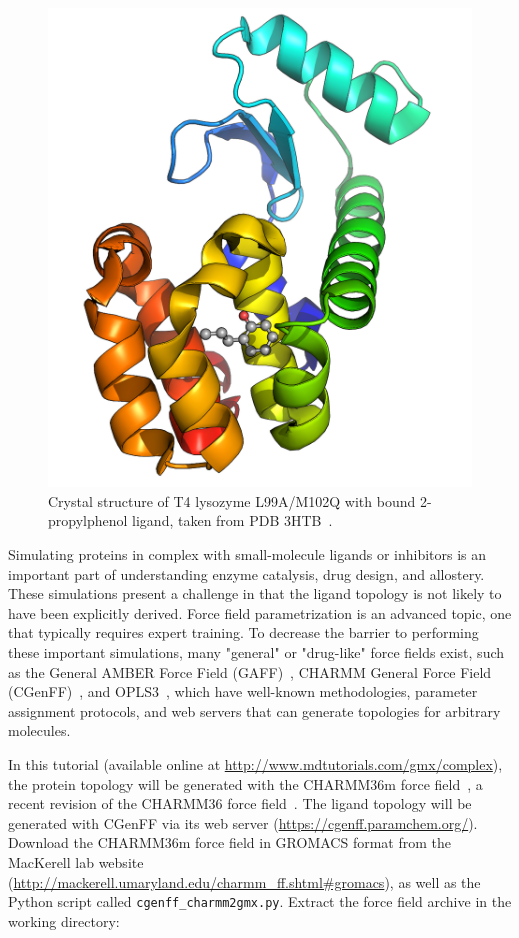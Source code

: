 \documentclass[9pt,tutorial]{livecoms}
\newcommand{\urlstring}{http://www.mdtutorials.com/gmx}
\newcommand{\tutorialcomplex}{\url{\urlstring/complex}}
\begin{document}
\begin{figure}[H]
\centering
\includegraphics{lysozyme_complex_3htb}
\caption{Crystal structure of T4 lysozyme L99A/M102Q with bound 2-propylphenol ligand, taken from PDB 3HTB~\cite{Boyce2009}.}
\label{lyso_complex_3htb_fig}
\end{figure}

Simulating proteins in complex with small-molecule ligands or inhibitors is an important part of understanding enzyme catalysis, drug design, and allostery. These simulations present a challenge in that the ligand topology is not likely to have been explicitly derived. Force field parametrization is an advanced topic, one that typically requires expert training. To decrease the barrier to performing these important simulations, many "general" or "drug-like" force fields exist, such as the General AMBER Force Field (GAFF)~\cite{Wang2004}, CHARMM General Force Field (CGenFF)~\cite{Vanommeslaeghe2010}, and OPLS3~\cite{Harder2016}, which have well-known methodologies, parameter assignment protocols, and web servers that can generate topologies for arbitrary molecules.

In this tutorial (available online at \tutorialcomplex), the protein topology will be generated with the CHARMM36m force field~\cite{Huang2016}, a recent revision of the CHARMM36 force field~\cite{Best2012}. The ligand topology will be generated with CGenFF via its web server (\url{https://cgenff.paramchem.org/}). Download the CHARMM36m force field in GROMACS format from the MacKerell lab website (\url{http://mackerell.umaryland.edu/charmm_ff.shtml#gromacs}), as well as the Python script called \texttt{cgenff\_charmm2gmx.py}. Extract the force field archive in the working directory:
\end{document}

